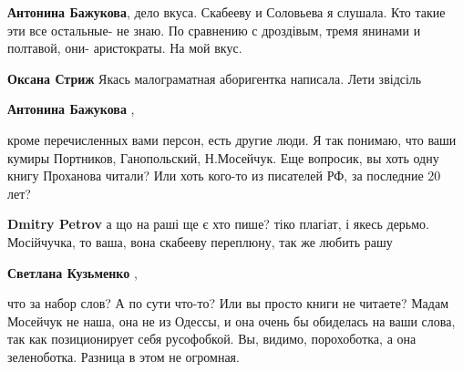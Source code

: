 \begin{itemize}
\begin{itemize}
 
\textbf{Антонина Бажукова}, дело вкуса. Скабееву и Соловьева я слушала. Кто такие эти все остальные- не знаю. По сравнению с дроздівым, тремя янинами и полтавой, они- аристократы. На мой вкус.

 
\textbf{Оксана Стриж} Якась малограматная аборигентка написала. Лети звідсіль

 
\textbf{Антонина Бажукова} , 

кроме перечисленных вами персон, есть другие люди. Я так понимаю, что ваши
кумиры Портников, Ганопольский, Н.Мосейчук. Еще вопросик, вы хоть одну книгу
Проханова читали? Или хоть кого-то из писателей РФ, за последние 20 лет?


 
\textbf{Dmitry Petrov} а що на раші ще є хто пише? тіко плагіат, і якесь дерьмо. Мосійчучка, то ваша, вона скабееву переплюну, так же любить рашу

 
\textbf{Светлана Кузьменко} , 

что за набор слов? А по сути что-то? Или вы
просто книги не читаете? Мадам Мосейчук не наша, она не из Одессы, и она очень
бы обиделась на ваши слова, так как позиционирует себя русофобкой. Вы, видимо,
порохоботка, а она зеленоботка. Разница в этом не огромная.


\end{itemize}
\end{itemize}
